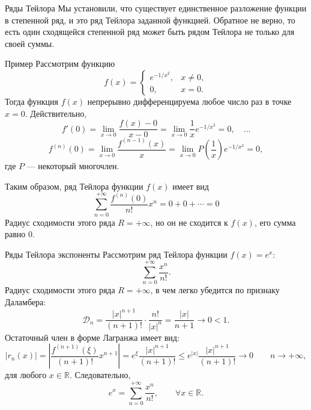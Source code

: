 \documentclass[8pt]{beamer}
\begin{document}
\begin{frame}{Ряды Тейлора}
Мы установили, что существует единственное разложение функции в степенной ряд, и это ряд Тейлора заданной функцией. Обратное не верно, то есть один сходящейся степенной ряд может быть рядом Тейлора не только для своей суммы.

\begin{block}{Пример}
Рассмотрим функцию
$$f(x) = \left\{ \begin{array}{ll}
e^{-1/x^2},&x\ne 0,\\
0,& x=0.
\end{array}\right.
$$
Тогда функция $f(x)$ непрерывно дифференцируема любое число раз в точке $x=0$. Действительно,
$$f'(0) = \lim_{x\to0} \frac{f(x) -0}{x-0} = \lim_{x\to0}\frac{1}{x}e^{-1/x^2} = 0,\quad\ldots$$
$$ f^{(n)}(0) = \lim_{x\to0}\frac{f^{(n-1)}(x)}{x} = \lim_{x\to0} P\left(\frac{1}{x}\right) e^{-1/x^2} = 0,$$
где $P$ --- некоторый многочлен.
\end{block}
Таким образом, ряд Тейлора функции $f(x)$ имеет вид
$$\sum_{n=0}^{+\infty}\frac{f^{(n)}(0)}{n!}x^n = 0+0+\cdots = 0$$
Радиус сходимости этого ряда $R=+\infty$, но он не сходится к $f(x)$, его сумма равно 0.
\end{frame}



\begin{frame}{Ряды Тейлора экспоненты}
Рассмотрим ряд Тейлора функции $ f(x) = e^x$:
$$\sum_{n=0}^{+\infty}\frac{x^n}{n!}.$$
Радиус сходимости этого ряда $R = +\infty$, в чем легко убедится по признаку Даламбера:
$$\mathcal{D}_n =\frac{|x|^{n+1}}{(n+1)!}\cdot\frac{n!}{|x|^n} = \frac{|x|}{n+1}\to0<1.$$
Остаточный член в форме Лагранжа имеет вид:
$$|r_n(x)| = \left| \frac{f^{(n+1)}(\xi)}{(n+1)!}x^{n+1} \right| =e^\xi \frac{|x|^{n+1}}{(n+1)!}\le e^{|x|}\frac{|x|^{n+1}}{(n+1)!} \to0 
\qquad n\to+\infty,$$
для любого $x\in\mathbb{R}$. Следовательно,
$$e^x =\sum_{n=0}^{+\infty}\frac{x^n}{n!},\qquad \forall x\in\mathbb{R}.$$
\end{frame}
\end{document}
